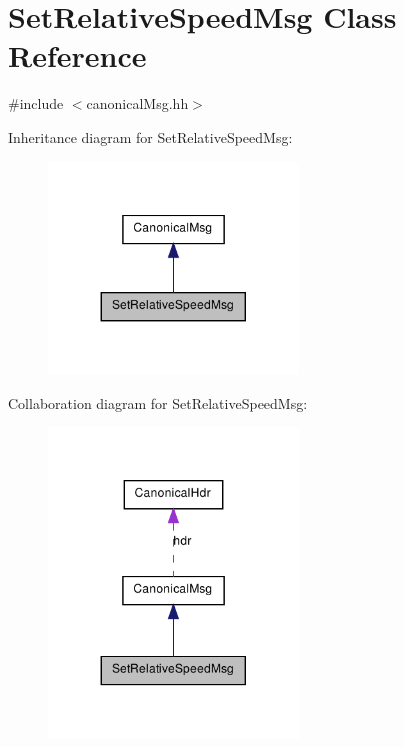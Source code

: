 \hypertarget{class_set_relative_speed_msg}{
\section{SetRelativeSpeedMsg Class Reference}
\label{class_set_relative_speed_msg}
}


{\ttfamily \#include $<$canonicalMsg.hh$>$}



Inheritance diagram for SetRelativeSpeedMsg:\nopagebreak
\begin{figure}[H]
\begin{center}
\leavevmode
\includegraphics[width=188pt]{class_set_relative_speed_msg__inherit__graph}
\end{center}
\end{figure}


Collaboration diagram for SetRelativeSpeedMsg:\nopagebreak
\begin{figure}[H]
\begin{center}
\leavevmode
\includegraphics[width=188pt]{class_set_relative_speed_msg__coll__graph}
\end{center}
\end{figure}
